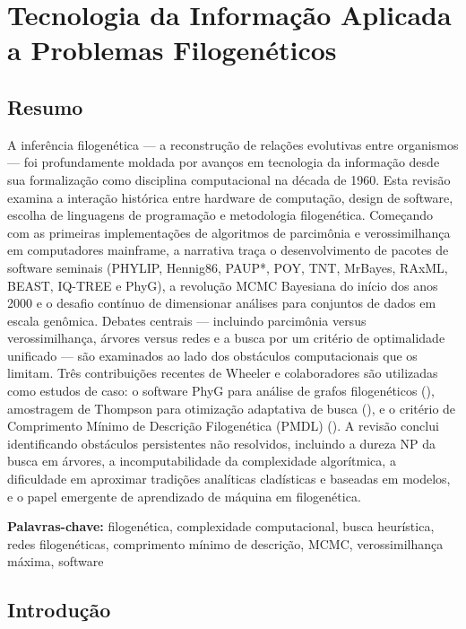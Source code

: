 
\chapter{Tecnologia da Informação Aplicada a Problemas Filogenéticos}

\section*{Resumo}

A inferência filogenética --- a reconstrução de relações evolutivas entre organismos --- foi profundamente moldada por avanços em tecnologia da informação desde sua formalização como disciplina computacional na década de 1960. Esta revisão examina a interação histórica entre hardware de computação, design de software, escolha de linguagens de programação e metodologia filogenética. Começando com as primeiras implementações de algoritmos de parcimônia e verossimilhança em computadores mainframe, a narrativa traça o desenvolvimento de pacotes de software seminais (PHYLIP, Hennig86, PAUP*, POY, TNT, MrBayes, RAxML, BEAST, IQ-TREE e PhyG), a revolução MCMC Bayesiana do início dos anos 2000 e o desafio contínuo de dimensionar análises para conjuntos de dados em escala genômica. Debates centrais --- incluindo parcimônia versus verossimilhança, árvores versus redes e a busca por um critério de optimalidade unificado --- são examinados ao lado dos obstáculos computacionais que os limitam. Três contribuições recentes de Wheeler e colaboradores são utilizadas como estudos de caso: o software PhyG para análise de grafos filogenéticos (\textcite{wheeler2024a}), amostragem de Thompson para otimização adaptativa de busca (\textcite{wheeler2024}), e o critério de Comprimento Mínimo de Descrição Filogenética (PMDL) (\textcite{wheeler2025}). A revisão conclui identificando obstáculos persistentes não resolvidos, incluindo a dureza NP da busca em árvores, a incomputabilidade da complexidade algorítmica, a dificuldade em aproximar tradições analíticas cladísticas e baseadas em modelos, e o papel emergente de aprendizado de máquina em filogenética.

\textbf{Palavras-chave:} filogenética, complexidade computacional, busca heurística, redes filogenéticas, comprimento mínimo de descrição, MCMC, verossimilhança máxima, software

\section{Introdução}

